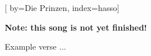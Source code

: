 
[%
    by={Die Prinzen},
    index={hasso}]


    \label{hasso}

    \textbf{Note: this song is not yet finished!}

    \beginverse
        Example verse ...
    \endverse
\endsong
